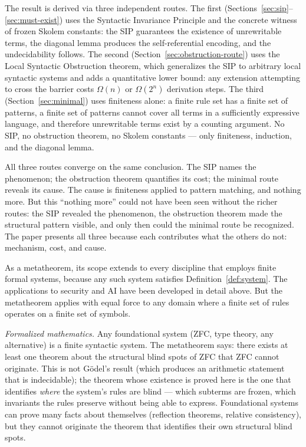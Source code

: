 \documentclass[11pt]{article}
\begin{document}
The result is derived via three independent routes. The first
(Sections~\ref{sec:sip}--\ref{sec:must-exist}) uses the Syntactic
Invariance Principle and the concrete witness of frozen Skolem constants:
the SIP guarantees the existence of unrewritable terms, the diagonal
lemma produces the self-referential encoding, and the undecidability
follows. The second (Section~\ref{sec:obstruction-route}) uses the Local
Syntactic Obstruction theorem, which generalizes the SIP to arbitrary
local syntactic systems and adds a quantitative lower bound: any
extension attempting to cross the barrier costs $\Omega(n)$ or
$\Omega(2^n)$ derivation steps. The third
(Section~\ref{sec:minimal}) uses finiteness alone: a finite rule set
has a finite set of patterns, a finite set of patterns cannot cover all
terms in a sufficiently expressive language, and therefore unrewritable
terms exist by a counting argument. No SIP, no obstruction theorem, no
Skolem constants --- only finiteness, induction, and the diagonal lemma.

\medskip

All three routes converge on the same conclusion. The SIP names the
phenomenon; the obstruction theorem quantifies its cost; the minimal
route reveals its cause. The cause is finiteness applied to pattern
matching, and nothing more. But this ``nothing more'' could not have
been seen without the richer routes: the SIP revealed the phenomenon,
the obstruction theorem made the structural pattern visible, and only
then could the minimal route be recognized. The paper presents all three
because each contributes what the others do not: mechanism, cost, and
cause.

\medskip

As a metatheorem, its scope extends to every discipline that employs
finite formal systems, because any such system satisfies
Definition~\ref{def:system}. The applications to security and AI have
been developed in detail above. But the metatheorem applies with equal
force to any domain where a finite set of rules operates on a finite
set of symbols.

\smallskip

\emph{Formalized mathematics.}
Any foundational system (ZFC, type theory, any alternative) is a finite
syntactic system. The metatheorem says: there exists at least one theorem
about the structural blind spots of ZFC that ZFC cannot originate. This
is not G\"odel's result (which produces an arithmetic statement that is
indecidable); the theorem whose existence is proved here is the one that
identifies \emph{where} the system's rules are blind --- which subterms
are frozen, which invariants the rules preserve without being able to
express. Foundational systems can prove many facts about themselves
(reflection theorems, relative consistency), but they cannot originate
the theorem that identifies their own structural blind spots.
\end{document}

